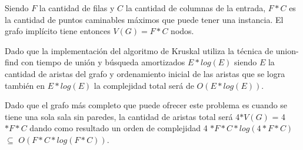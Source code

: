Siendo $F$ la cantidad de filas y $C$ la cantidad de columnas de la entrada, $F \ast C$ es la cantidad de puntos caminables máximos que puede tener una instancia. El grafo impl\'icito tiene entonces $V(G) = F \ast C $ nodos.

Dado que la implementación del algoritmo de Kruskal utiliza la técnica de union-find con tiempo de uni\'on y b\'usqueda amortizados $E \ast log(E)$ siendo $E$ la cantidad de aristas del grafo y  ordenamiento inicial de las aristas que se logra tambi\'en en $E \ast log(E)$ la complejidad total será de $O(E \ast log(E))$.

Dado que el grafo más completo que puede ofrecer este problema es cuando se tiene una sola sala sin paredes, la cantidad de aristas total será 4$\ast  V(G)$ = 4$\ast  F \ast C$ dando como resultado un orden de complejidad 4 $\ast F \ast C \ast log(4 \ast F \ast C)$ $\subseteq$ $O(F \ast C \ast log(F \ast C))$.
